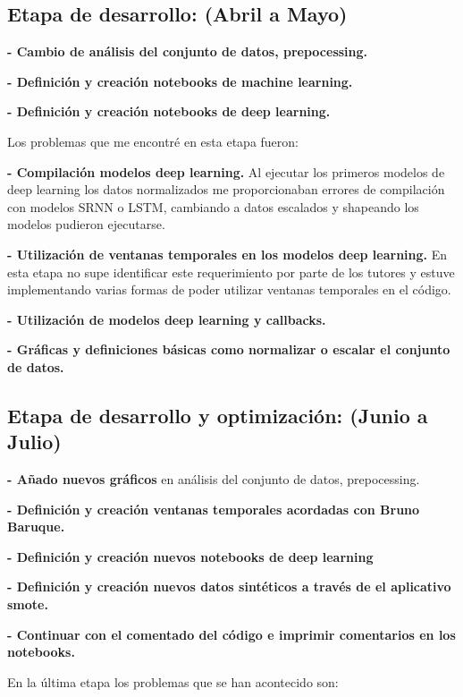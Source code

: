 \subsection{Etapa de desarrollo: (Abril a Mayo)}



\textbf{- Cambio de análisis del conjunto de datos, prepocessing.}

\textbf{- Definición y creación notebooks de machine learning.}

\textbf{- Definición y creación notebooks de deep learning.}


Los problemas que me encontré en esta etapa fueron:

\textbf{- Compilación modelos deep learning. }Al ejecutar los primeros modelos de deep learning los datos normalizados me proporcionaban errores de compilación con modelos SRNN o LSTM, cambiando a datos escalados y shapeando los modelos pudieron ejecutarse.

\textbf{- Utilización de ventanas temporales en los modelos deep learning.} En esta etapa no supe identificar este requerimiento por parte de los tutores y estuve implementando varias formas de poder utilizar ventanas temporales en el código.

\textbf{- Utilización de modelos deep learning y callbacks.} 

\textbf{- Gráficas y definiciones básicas como normalizar o escalar el conjunto de datos.}


\subsection{Etapa de desarrollo y optimización: (Junio a Julio)}



\textbf{- Añado nuevos gráficos} en análisis del conjunto de datos, prepocessing.

\textbf{- Definición y creación ventanas temporales acordadas con Bruno Baruque.}

\textbf{- Definición y creación nuevos notebooks de deep learning}

\textbf{- Definición y creación nuevos datos sintéticos a través de el aplicativo smote.}

\textbf{- Continuar con el comentado del código e imprimir comentarios en los notebooks.}


En la última etapa los problemas que se han acontecido son:

